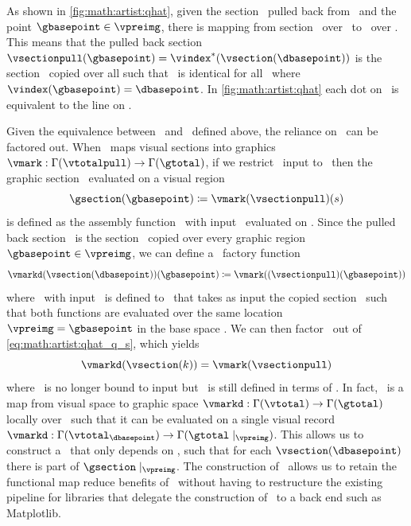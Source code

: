\documentclass[../main.tex]{subfiles}
\begin{document}
As shown in \autoref{fig:math:artist:qhat}, given the section \vsectionpull\ pulled back from \vsection\ and the point $\gbasepoint \in \vpreimg$, there is mapping from section \vsectionpull\ over \gbasepoint\ to \vsection\ over \dbasepoint. This means that the pulled back section $\vsectionpull(\gbasepoint) = \vindex^*(\vsection(\dbasepoint))$ is the section \vsection\ copied over all \gbasepoint such that \vsectionpull\ is identical for all \gbasepoint\ where $\vindex(\gbasepoint) = \dbasepoint$. In \autoref{fig:math:artist:qhat} each dot on \vfiber\ is equivalent to the line on \vfiberpull. 

Given the equivalence between \vsection\ and \vsectionpull\ defined above, the reliance on \gbase\ can be factored out. When \vmark\ maps visual sections into graphics $\vmark: \Gamma(\vtotalpull) \rightarrow \Gamma(\gtotal)$, if we restrict \vmark\ input to \vsectionpull\ then the graphic section \gsection\ evaluated on a visual region \gbasepoint\
\begin{equation}
    \gsection(\gbasepoint) \coloneqq \vmark(\vsectionpull)(s)
    \label{eq:math:artist:qhat_factor}
\end{equation}
 is defined as the assembly function \vmark\ with input \vsectionpull\ evaluated on \gbasepoint. Since the pulled back section \vsectionpull\ is the section \vsection\ copied over every graphic region $\gbasepoint \in \vpreimg$, we can define a \vmark\ factory function 
\begin{equation}
\label{eq:math:artist:qhat_q_s}
\vmarkd(\vsection(\dbasepoint))(\gbasepoint) \coloneqq \vmark((\vsectionpull)(\gbasepoint))
\end{equation} 
where \vmarkd\ with input \vsection\ is defined to \vmark\ that takes as input the copied section \vsectionpull\ such that both functions are evaluated over the same location $\vpreimg = \gbasepoint$ in the base space \gbase. We can then factor \gbasepoint\ out of \autoref{eq:math:artist:qhat_q_s}, which yields
\begin{equation}
\vmarkd(\vsection(k)) = \vmark(\vsectionpull)
\label{eq:math:artist:qhat_k}
\end{equation}
where \vmark\ is no longer bound to input but \vmarkd\ is still defined in terms of \dbase. In fact, \vmarkd\ is a map from visual space to graphic space $\vmarkd:\Gamma(\vtotal) \rightarrow \Gamma(\gtotal)$ locally over \dbasepoint\ such that it can be evaluated on a single visual record  $\vmarkd:\Gamma(\vtotal_{\dbasepoint}) \rightarrow \Gamma(\gtotal\mid_{\vpreimg})$. This allows us to construct a \vmarkd\ that only depends on \dbase, such that for each $\vsection(\dbasepoint)$ there is part of $\gsection\mid_{\vpreimg}$. The construction of \vmarkd\ allows us to retain the functional map reduce benefits of \vmark\ without having to restructure the existing pipeline for libraries that delegate the construction of \gsection\ to a back end such as Matplotlib.
\end{document}
